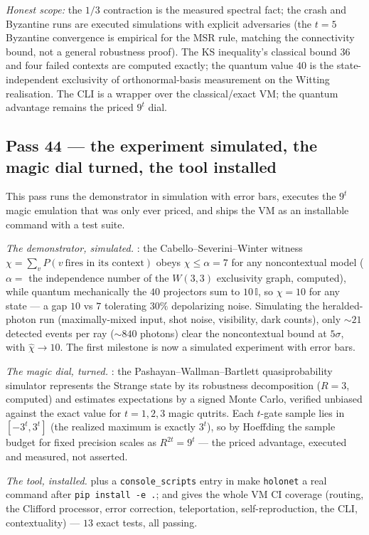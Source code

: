 \documentclass[11pt]{article}
\begin{document}
\emph{Honest scope:} the $1/3$ contraction is the measured spectral fact; the crash and Byzantine runs
are executed simulations with explicit adversaries (the $t=5$ Byzantine convergence is empirical for the
MSR rule, matching the connectivity bound, not a general robustness proof). The KS inequality's classical
bound $36$ and four failed contexts are computed exactly; the quantum value $40$ is the state-independent
exclusivity of orthonormal-basis measurement on the Witting realisation. The CLI is a wrapper over the
classical/exact VM; the quantum advantage remains the priced $9^t$ dial.

\subsection{Pass 44 --- the experiment simulated, the magic dial turned, the tool installed}
\label{sec:capstone-fortyfour}

This pass runs the demonstrator in simulation with error bars, executes the $9^t$ magic emulation that
was only ever priced, and ships the VM as an installable command with a test suite.

\emph{The demonstrator, simulated.} : the
Cabello--Severini--Winter witness $\chi=\sum_{v}P(v\ \text{fires in its context})$ obeys
$\chi\le\alpha=7$ for any noncontextual model ($\alpha=$ the independence number of the $W(3,3)$
exclusivity graph, computed), while quantum mechanically the $40$ projectors sum to $10\,\mathbb{I}$, so
$\chi=10$ for any state --- a gap $10$ vs $7$ tolerating $30\%$ depolarizing noise. Simulating the
heralded-photon run (maximally-mixed input, shot noise, visibility, dark counts), only $\sim21$ detected
events per ray ($\sim840$ photons) clear the noncontextual bound at $5\sigma$, with $\hat\chi\to10$. The
first milestone is now a simulated experiment with error bars.

\emph{The magic dial, turned.} : the Pashayan--Wallman--Bartlett
quasiprobability simulator represents the Strange state by its robustness decomposition ($R=3$,
computed) and estimates expectations by a signed Monte Carlo, verified unbiased against the exact value
for $t=1,2,3$ magic qutrits. Each $t$-gate sample lies in $[-3^t,3^t]$ (the realized maximum is exactly
$3^t$), so by Hoeffding the sample budget for fixed precision scales as $R^{2t}=9^t$ --- the priced
advantage, executed and measured, not asserted.

\emph{The tool, installed.}  plus a \texttt{console\_scripts} entry in
 make \texttt{holonet} a real command after \texttt{pip install -e .}; and
 gives the whole VM CI coverage (routing, the Clifford processor, error
correction, teleportation, self-reproduction, the CLI, contextuality) --- $13$ exact tests, all passing.
\end{document}

